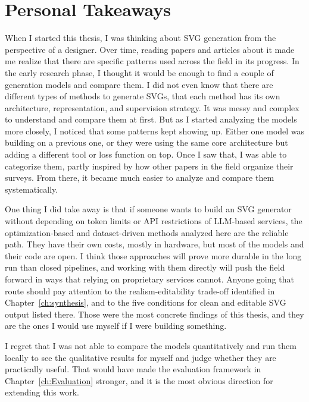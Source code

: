 \section{Personal Takeaways}

When I started this thesis, I was thinking about SVG 
generation from the perspective of a designer. Over time, 
reading papers and articles about it made me realize that 
there are specific patterns used across the field in its progress.
In the early research phase, I 
thought it would be enough to find a couple of generation 
models and compare them. I did not even know that there 
are different types of methods to generate SVGs, that 
each method has its own architecture, representation, 
and supervision strategy. It was messy and complex to 
understand and compare them at first. 
But as I started analyzing the models more closely, I 
noticed that some patterns kept showing up. Either one 
model was building on a previous one, or they were using 
the same core architecture but adding a different tool 
or loss function on top. Once I saw that, I was able to 
categorize them, partly inspired by how other papers in 
the field organize their surveys. From there, it became 
much easier to analyze and compare them systematically.

One thing I did take away is that if someone 
wants to build an SVG generator without depending on 
token limits or API restrictions of LLM-based services, 
the optimization-based and dataset-driven methods 
analyzed here are the reliable path. They have their own 
costs, mostly in hardware, but most of the models 
and their code are open. I think those approaches will 
prove more durable in the long run than closed 
pipelines, and working with them directly will push the 
field forward in ways that relying on proprietary 
services cannot. Anyone going that route should pay 
attention to the realism-editability trade-off 
identified in Chapter~\ref{ch:synthesis}, and to the 
five conditions for clean and editable SVG output 
listed there. Those were the most concrete findings of 
this thesis, and they are the ones I would use myself 
if I were building something.

I regret that I was not able to compare the models 
quantitatively and run them locally to see the qualitative results 
for myself and judge whether they are practically 
useful. That would have made the evaluation framework 
in Chapter~\ref{ch:Evaluation} stronger, and it is the 
most obvious direction for extending this work.